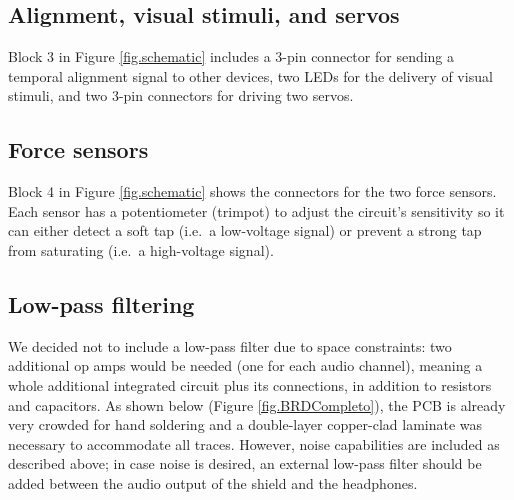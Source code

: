 \documentclass[twocolumn]{article}
\begin{document}
\subsection{Alignment, visual stimuli, and servos}

Block 3 in Figure \ref{fig.schematic} includes a 3-pin connector for sending a temporal alignment signal to other devices, two LEDs for the delivery of visual stimuli, and two 3-pin connectors for driving two servos.


\subsection{Force sensors}

Block 4 in Figure \ref{fig.schematic} shows the connectors for the two force sensors. Each sensor has a potentiometer (trimpot) to adjust the circuit's sensitivity so it can either detect a soft tap (i.e.\ a low-voltage signal) or prevent a strong tap from saturating (i.e.\ a high-voltage signal).


\subsection{Low-pass filtering}

We decided not to include a low-pass filter due to space constraints: two additional op amps would be needed (one for each audio channel), meaning a whole additional integrated circuit plus its connections, in addition to resistors and capacitors. As shown below (Figure \ref{fig.BRDCompleto}), the PCB is already very crowded for hand soldering and a double-layer copper-clad laminate was necessary to accommodate all traces. However, noise capabilities are included as described above; in case noise is desired, an external low-pass filter should be added between the audio output of the shield and the headphones.
\end{document}
